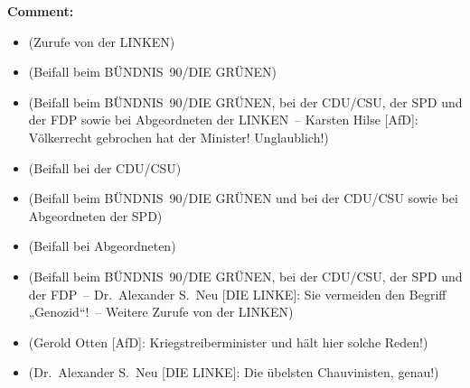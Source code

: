 \documentclass{article}
\begin{document}
\noindent\textbf{Comment:}
\begin{itemize}
    \setlength\itemsep{-3pt}
    \item (Zurufe von der LINKEN)
    \setlength\itemsep{-3pt}
    \item (Beifall beim BÜNDNIS 90/DIE GRÜNEN)
    \setlength\itemsep{-3pt}
    \item (Beifall beim BÜNDNIS 90/DIE GRÜNEN, bei der CDU/CSU, der SPD und der FDP sowie bei Abgeordneten der LINKEN – Karsten Hilse [AfD]: Völkerrecht gebrochen hat der Minister! Unglaublich!)
    \setlength\itemsep{-3pt}
    \item (Beifall bei der CDU/CSU)
    \setlength\itemsep{-3pt}
    \item (Beifall beim BÜNDNIS 90/DIE GRÜNEN und bei der CDU/CSU sowie bei Abgeordneten der SPD)
    \setlength\itemsep{-3pt}
    \item (Beifall bei Abgeordneten)
    \setlength\itemsep{-3pt}
    \item (Beifall beim BÜNDNIS 90/DIE GRÜNEN, bei der CDU/CSU, der SPD und der FDP – Dr. Alexander S. Neu [DIE LINKE]: Sie vermeiden den Begriff „Genozid“! – Weitere Zurufe von der LINKEN)
    \setlength\itemsep{-3pt}
    \item (Gerold Otten [AfD]: Kriegstreiberminister und hält hier solche Reden!)
    \setlength\itemsep{-3pt}
    \item (Dr. Alexander S. Neu [DIE LINKE]: Die übelsten Chauvinisten, genau!)
\end{itemize}
\end{document}
